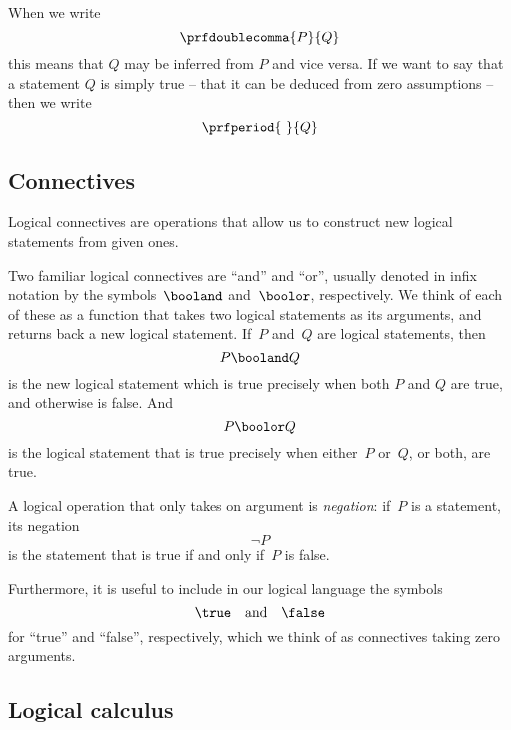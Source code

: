 When we write
\begin{equation*}
    \prfdoublecomma{
        P
    }{
        Q
    }
\end{equation*}
this means that $Q$ may be inferred from $P$ and vice versa. If we want to say that a statement $Q$ is simply true -- that it can be deduced from zero assumptions -- then we write 
\begin{equation*}
    \prfperiod{
        \ 
    }{
        Q
    }
\end{equation*}

\subsection{Connectives}

Logical connectives are operations that allow us to construct new logical statements from given ones. 

Two familiar logical connectives are ``and'' and ``or'', usually denoted in infix notation by the symbols~$\booland$ and~$\boolor$, respectively. We think of each of these as a function that takes two logical statements as its arguments, and returns back a new logical statement. If~$P$ and~$Q$ are logical statements, then~
\begin{equation*}
P \booland Q
\end{equation*}
is the new logical statement which is true precisely when both $P$ and $Q$ are true, and otherwise is false.
And
\begin{equation*}
P \boolor Q
\end{equation*}
is the logical statement that is true precisely when either~$P$ or~$Q$, or both, are true.

A logical operation that only takes on argument is \emph{negation}: if~$P$ is a statement, its negation
\begin{equation*}
\lnot P
\end{equation*}
is the statement that is true if and only if~$P$ is false.

Furthermore, it is useful to include in our logical language the symbols~
\begin{equation}
\true \quad \text{and}  \quad \false
\end{equation}
for ``true'' and ``false'', respectively, which we think of as connectives taking zero arguments.

\subsection{Logical calculus}

